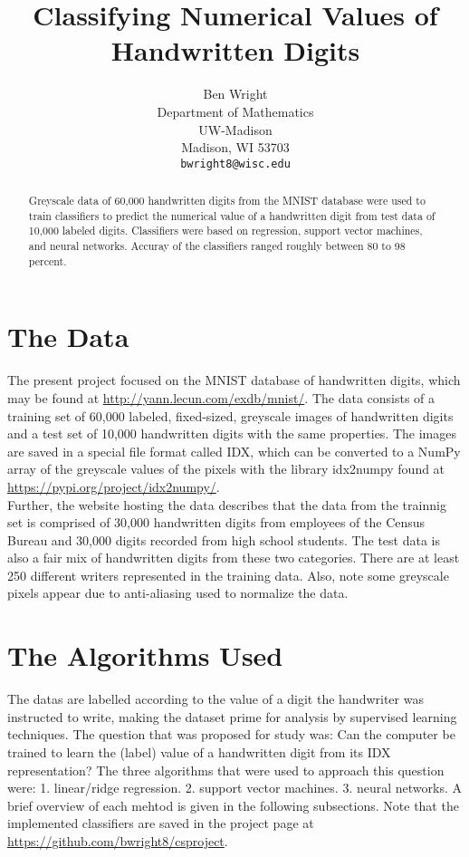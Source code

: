 \documentclass{article}
\title{Classifying Numerical Values of Handwritten Digits}
\author{
  Ben Wright \\
  Department of Mathematics\\
  UW-Madison\\
  Madison, WI 53703 \\
  \texttt{bwright8@wisc.edu} \\
}
\begin{document}
\maketitle

\begin{abstract}
  Greyscale data of 60,000 handwritten digits from the MNIST database were used to train classifiers to predict the numerical value of a handwritten digit from test data of 10,000 labeled digits. Classifiers were based on regression, support vector machines, and neural networks. Accuray of the classifiers ranged roughly between 80 to 98 percent.
\end{abstract}

\section{The Data}

The present project focused on the MNIST database of handwritten digits, which may be found at \url{http://yann.lecun.com/exdb/mnist/}. The data consists of  a training set of 60,000 labeled, fixed-sized, greyscale images of handwritten digits and a test set of 10,000 handwritten digits with the same properties. The images are saved in a special file format called IDX, which can be converted to a NumPy array of the greyscale values of the pixels with the library idx2numpy found at \url{https://pypi.org/project/idx2numpy/}. \\


Further, the website hosting the data describes that the data from the trainnig set is comprised of 30,000 handwritten digits from employees of the Census Bureau and 30,000 digits recorded from high school students. The test data is also a fair mix of handwritten digits from these two categories. There are at least 250 different writers represented in the training data. Also, note some greyscale pixels appear due to anti-aliasing used to normalize the data. 


\section{The Algorithms Used}

The datas are labelled according to the value of a digit the handwriter was instructed to write, making the dataset prime for analysis by supervised learning techniques. The question that was proposed for study was: Can the computer be trained to learn the (label) value of a handwritten digit from its IDX representation? The three algorithms that were used to approach this question were: 1. linear/ridge regression. 2. support vector machines. 3. neural networks. A brief overview of each mehtod is given in the following subsections. Note that the implemented classifiers are saved in the project page at \url{https://github.com/bwright8/csproject}.
\end{document}
